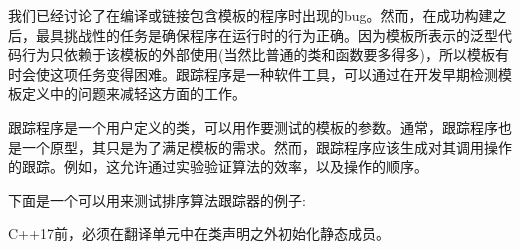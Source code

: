 我们已经讨论了在编译或链接包含模板的程序时出现的bug。然而，在成功构建之后，最具挑战性的任务是确保程序在运行时的行为正确。因为模板所表示的泛型代码行为只依赖于该模板的外部使用(当然比普通的类和函数要多得多)，所以模板有时会使这项任务变得困难。跟踪程序是一种软件工具，可以通过在开发早期检测模板定义中的问题来减轻这方面的工作。

跟踪程序是一个用户定义的类，可以用作要测试的模板的参数。通常，跟踪程序也是一个原型，其只是为了满足模板的需求。然而，跟踪程序应该生成对其调用操作的跟踪。例如，这允许通过实验验证算法的效率，以及操作的顺序。

下面是一个可以用来测试排序算法跟踪器的例子:

\begin{tcolorbox}[colback=webgreen!5!white,colframe=webgreen!75!black]
\hspace*{0.75cm}C++17前，必须在翻译单元中在类声明之外初始化静态成员。
\end{tcolorbox}

